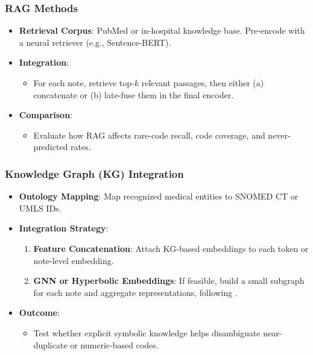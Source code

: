 \subsubsection{RAG Methods}
\begin{itemize}
    \item \textbf{Retrieval Corpus}: PubMed or in-hospital knowledge base. Pre-encode with a neural retriever (e.g., Sentence-BERT).
    \item \textbf{Integration}:
    \begin{itemize}
        \item For each note, retrieve top-$k$ relevant passages, then either (a) concatenate or (b) late-fuse them in the final encoder.
    \end{itemize}
    \item \textbf{Comparison}:
    \begin{itemize}
        \item Evaluate how RAG affects rare-code recall, code coverage, and never-predicted rates.
    \end{itemize}
\end{itemize}

\subsubsection{Knowledge Graph (KG) Integration}
\begin{itemize}
    \item \textbf{Ontology Mapping}: Map recognized medical entities to SNOMED CT or UMLS IDs.
    \item \textbf{Integration Strategy}:
    \begin{enumerate}
        \item \textbf{Feature Concatenation}: Attach KG-based embeddings to each token or note-level embedding.
        \item \textbf{GNN or Hyperbolic Embeddings}: If feasible, build a small subgraph for each note and aggregate representations, following \cite{ren2022hicu}.
    \end{enumerate}
    \item \textbf{Outcome}:
    \begin{itemize}
        \item Test whether explicit symbolic knowledge helps disambiguate near-duplicate or numeric-based codes.
    \end{itemize}
\end{itemize}

